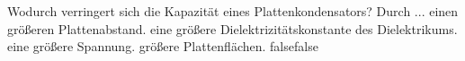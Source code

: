     {Wodurch verringert sich die Kapazität eines Plattenkondensators? Durch ...}
    {einen größeren Plattenabstand.}
    {eine größere Dielektrizitätskonstante des Dielektrikums.}
    {eine größere Spannung.}
    {größere Plattenflächen.}
    {false}{false}